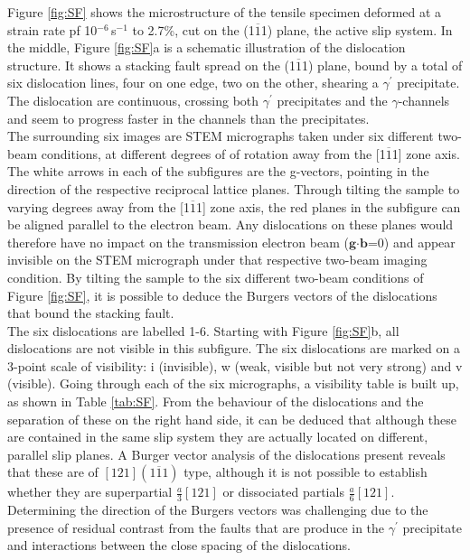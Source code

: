 \documentclass[a4paper,12pt,times,numbered,print,index]{Classes/PhDThesisPSnPDF}
\begin{document}
Figure \ref{fig:SF} shows the microstructure of the tensile specimen deformed at a strain rate pf 10$^{-6}$\,s$^{-1}$ to 2.7\%, cut on the (1$\overline{1}$1) plane, the active slip system. In the middle, Figure \ref{fig:SF}a is a schematic illustration of the dislocation structure. It shows a stacking fault spread on the (1$\overline{1}$1) plane, bound by a total of six dislocation lines, four on one edge, two on the other, shearing a $\gamma^\prime$ precipitate. The dislocation are continuous, crossing both $\gamma^\prime$ precipitates and the $\gamma$-channels and seem to progress faster in the channels than the precipitates.\\The surrounding six images are STEM micrographs taken under six different two-beam conditions, at different degrees of of rotation away from the [1$\overline{1}$1] zone axis. The white arrows in each of the subfigures are the g-vectors, pointing in the direction of the respective reciprocal lattice planes. Through tilting the sample to varying degrees away from the [1$\overline{1}$1] zone axis, the red planes in the subfigure can be aligned parallel to the electron beam. Any dislocations on these planes would therefore have no impact on the transmission electron beam ($\textbf{g}$$\cdot$$\textbf{b}$=0) and appear invisible on the STEM micrograph under that respective two-beam imaging condition. By tilting the sample to the six different two-beam conditions of Figure \ref{fig:SF}, it is possible to deduce the Burgers vectors of the dislocations that bound the stacking fault.\\
The six dislocations are labelled 1-6. Starting with Figure \ref{fig:SF}b, all dislocations are not visible in this subfigure. The six dislocations are marked on a 3-point scale of visibility: i (invisible), w (weak, visible but not very strong) and v (visible). Going through each of the six micrographs, a visibility table is built up, as shown in Table \ref{tab:SF}. 
From the behaviour of the dislocations and the separation of these on the right hand side, it can be deduced that although these are contained in the same slip system they are actually located on different, parallel slip planes. A Burger vector analysis of the dislocations present reveals that these are of $[121](1\overline{1}1)$ type, although it is not possible to establish whether they are superpartial $\frac{a}{3}[121]$ or dissociated partials $\frac{a}{6}[121]$. Determining the direction of the Burgers vectors was challenging due to the presence of residual contrast from the faults that are produce in the $\gamma^\prime$ precipitate and interactions between the close spacing of the dislocations.\\
\end{document}
